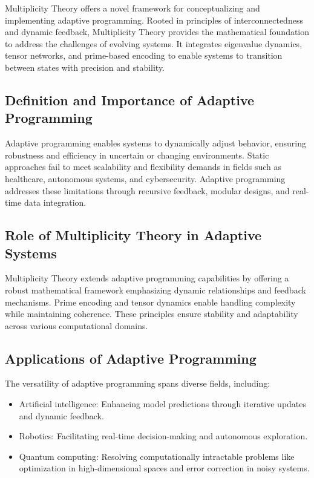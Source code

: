 \documentclass{article}
\theoremstyle{plain}
\begin{document}
Multiplicity Theory offers a novel framework for conceptualizing and implementing adaptive programming. Rooted in principles of interconnectedness and dynamic feedback, Multiplicity Theory provides the mathematical foundation to address the challenges of evolving systems\cite{farhi2014quantum}. It integrates eigenvalue dynamics, tensor networks, and prime-based encoding to enable systems to transition between states with precision and stability.

\subsection{Definition and Importance of Adaptive Programming}

Adaptive programming enables systems to dynamically adjust behavior, ensuring robustness and efficiency in uncertain or changing environments. Static approaches fail to meet scalability and flexibility demands in fields such as healthcare, autonomous systems, and cybersecurity. Adaptive programming addresses these limitations through recursive feedback, modular designs, and real-time data integration\cite{arute2019quantum}.

\subsection{Role of Multiplicity Theory in Adaptive Systems}

Multiplicity Theory extends adaptive programming capabilities by offering a robust mathematical framework emphasizing dynamic relationships and feedback mechanisms. Prime encoding and tensor dynamics enable handling complexity while maintaining coherence\cite{schuld2019supervised}. These principles ensure stability and adaptability across various computational domains.

\subsection{Applications of Adaptive Programming}

The versatility of adaptive programming spans diverse fields, including:
\begin{itemize}
    \item Artificial intelligence: Enhancing model predictions through iterative updates and dynamic feedback.
    \item Robotics: Facilitating real-time decision-making and autonomous exploration.
    \item Quantum computing: Resolving computationally intractable problems like optimization in high-dimensional spaces and error correction in noisy systems\cite{preskill2018quantum}.
\end{itemize}
\end{document}
